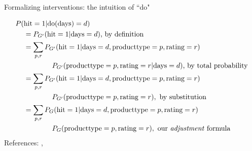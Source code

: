 \begin{frame}{Formalizing interventions: the intuition of ``do"}
    \vspace{-1.5cm}
    \vspace{-2.5cm}
    \begin{align*}
        P(&\textrm{hit}=1 | \mathrm{do}(\textrm{days})=d) \\
        & = P_{G'}(\textrm{hit}=1 | \textrm{days}=d) \textrm{, by definition} \\
        & = \sum_{p, r} P_{G'}(\textrm{hit}=1 | \textrm{days}=d, \textrm{producttype} = p, \textrm{rating} = r) \\
        & \qquad  \qquad P_{G'}(\textrm{producttype} = p, \textrm{rating} = r | \textrm{days}=d)\textrm{, by total probability} \\
        & = \sum_{p, r} P_{G'}(\textrm{hit}=1 | \textrm{days}=d, \textrm{producttype} = p, \textrm{rating} = r) \\
        & \qquad  \qquad P_{G'}(\textrm{producttype} = p, \textrm{rating} = r), \textrm{ by substitution} \\
        & =  \sum_{p, r} P_{G}(\textrm{hit}=1 | \textrm{days}=d, \textrm{producttype} = p, \textrm{rating} = r) \\
        & \qquad  \qquad P_{G}(\textrm{producttype} = p, \textrm{rating} = r), \textrm{ our \emph{adjustment} formula}
    \end{align*}
    References: \cite{pearl2016causal}, \cite{chmp}
\end{frame}

